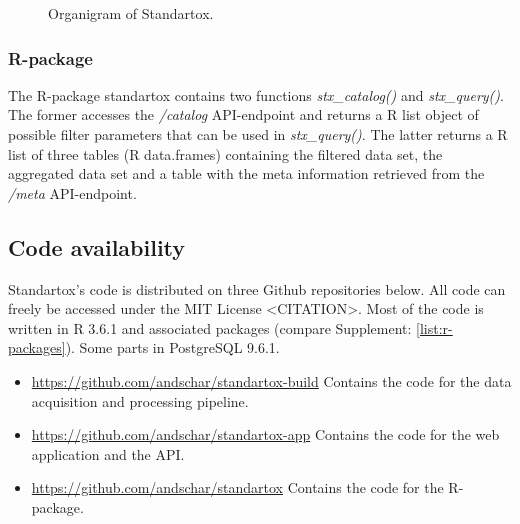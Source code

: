 \begin{figure}
    
    \caption{Organigram of Standartox.}
    \label{fig:stx-organigram}
\end{figure}


\subsubsection*{R-package}
The R-package standartox contains two functions \textit{stx\_catalog()} and \textit{stx\_query()}. The former accesses the \textit{/catalog} API-endpoint and returns a R list object of possible filter parameters that can be used in \textit{stx\_query()}. The latter returns a R list of three tables (R data.frames) containing the filtered data set, the aggregated data set and a table with the meta information retrieved from the \textit{/meta} API-endpoint.

\subsection*{Code availability}

Standartox's code is distributed on three Github repositories below. All code can freely be accessed under the MIT License <CITATION>. Most of the code is written in R 3.6.1 and associated packages (compare Supplement: \ref{list:r-packages}). Some parts in PostgreSQL 9.6.1.

\begin{itemize}

\item \url{https://github.com/andschar/standartox-build} \newline
Contains the code for the data acquisition and processing pipeline.

\item \url{https://github.com/andschar/standartox-app} \newline
Contains the code for the web application and the API.

\item \url{https://github.com/andschar/standartox} \newline
Contains the code for the R-package.

\end{itemize}

